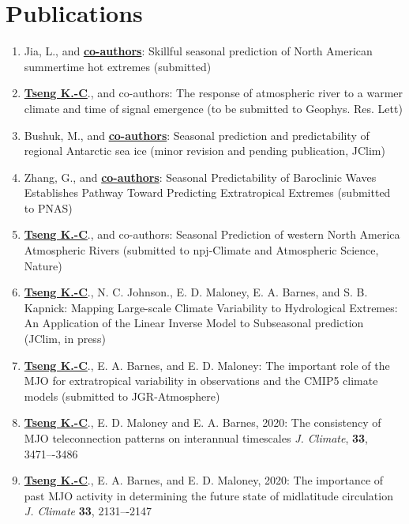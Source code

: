 \documentclass{article}
\begin{document}
\section{\color{airforceblue}Publications}
\begin{enumerate}
	\item Jia, L., and \normalsize{\bf{\underline{co-authors}}}: Skillful seasonal prediction of North American summertime hot extremes (submitted)
	\item \normalsize{\bf{\underline{Tseng K.-C}}}., and co-authors: The response of atmospheric river to a warmer climate and time of signal emergence (to be submitted to Geophys. Res. Lett) \par
	\item Bushuk, M., and \normalsize{\bf{\underline{co-authors}}}: Seasonal prediction and predictability of regional Antarctic sea ice (minor revision and pending publication, JClim) \par
	\item Zhang, G., and \normalsize{\bf{\underline{co-authors}}}: Seasonal Predictability of Baroclinic Waves Establishes Pathway Toward Predicting Extratropical Extremes (submitted to PNAS) \par
    \item \normalsize{\bf{\underline{Tseng K.-C}}}., and co-authors: Seasonal Prediction of western North America Atmospheric Rivers (submitted to npj-Climate and Atmospheric Science, Nature)\par
	\item \normalsize{\bf{\underline{Tseng K.-C}}}., N. C. Johnson., E. D. Maloney, E. A. Barnes, and S. B. Kapnick: Mapping Large-scale Climate Variability to Hydrological Extremes: An Application of the Linear Inverse Model to Subseasonal prediction (JClim, in press) 
	\item \normalsize{\bf{\underline{Tseng K.-C}}}., E. A. Barnes, and E. D. Maloney: The important role of the MJO for extratropical variability in observations and the CMIP5 climate models (submitted to JGR-Atmosphere)   
	\item \normalsize{\bf{\underline{Tseng K.-C}}}., E. D. Maloney and E. A. Barnes, 2020: The consistency of MJO teleconnection patterns on interannual timescales \textit{J. Climate}, \normalsize{\bf{33}}, 3471–-3486
	\item \normalsize{\bf{\underline{Tseng K.-C}}}., E. A. Barnes, and E. D. Maloney, 2020: The importance of past MJO activity in determining the future state of midlatitude circulation  \textit{J. Climate} \normalsize{\bf{33}}, 2131–-2147

\end{enumerate}
\end{document}
